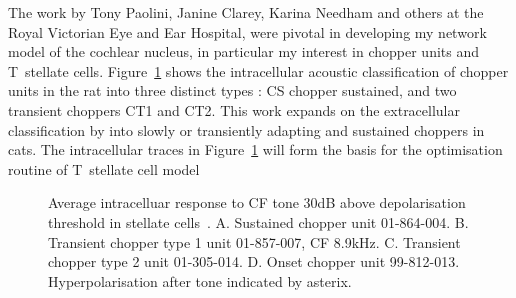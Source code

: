 


The work by Tony Paolini, Janine Clarey, Karina Needham and others at the Royal
Victorian Eye and Ear Hospital, were pivotal in developing my network model of
the cochlear nucleus, in particular my interest in chopper units and T~stellate
cells.  Figure~\ref{fig:PaoliniAIV} shows the intracellular acoustic
classification of chopper units in the rat into three distinct types
\citep{PaoliniClareyEtAl:2005}: CS chopper sustained, and two transient choppers
CT1 and CT2.  This work expands on the extracellular classification by
\citep{BlackburnSachs:1989} into slowly or transiently adapting and sustained
choppers in cats. The intracellular traces in Figure~\ref{fig:PaoliniAIV} will
form the basis for the optimisation routine of T~stellate cell model


\begin{figure}[htb]
  \centering
{}\hfill%
\hfill%
\caption[Average intracelluar response data in stellate cells in rats.]{Average
  intracelluar response to CF tone 30dB above depolarisation threshold in
  stellate
  cells~\citep[Reproduced~from~][]{PaoliniClareyEtAl:2005}. A. Sustained chopper
  unit 01-864-004. B. Transient chopper type 1 unit 01-857-007, CF
  8.9kHz. C. Transient chopper type 2 unit 01-305-014. D. Onset chopper unit
  99-812-013. Hyperpolarisation after tone indicated by
  asterix.  \label{fig:PaoliniAIV}}
\end{figure}



